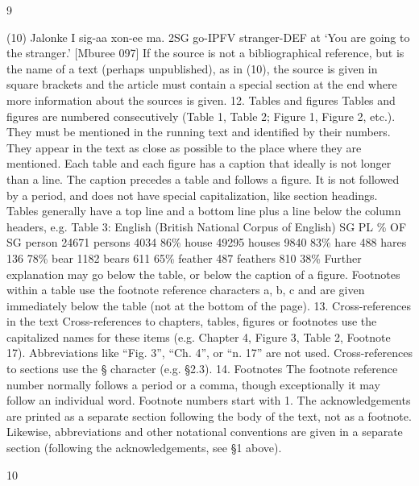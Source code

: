 
 9	
  
(10) Jalonke
I
 sig-aa
 xon-ee
 ma.
2SG go-IPFV stranger-DEF at
‘You are going to the stranger.’ [Mburee 097]
If the source is not a bibliographical reference, but is the name of a text (perhaps
unpublished), as in (10), the source is given in square brackets and the article must contain
a special section at the end where more information about the sources is given.
12. Tables and figures
Tables and figures are numbered consecutively (Table 1, Table 2; Figure 1, Figure 2, etc.).
They must be mentioned in the running text and identified by their numbers. They appear
in the text as close as possible to the place where they are mentioned.
Each table and each figure has a caption that ideally is not longer than a line. The
caption precedes a table and follows a figure. It is not followed by a period, and does not
have special capitalization, like section headings.
Tables generally have a top line and a bottom line plus a line below the column headers,
e.g.
Table 3: English (British National Corpus of English)
SG
 PL
 \% OF SG
person
 24671 persons 4034
 86\%
house
 49295 houses 9840
 83\%
hare
 488
 hares
 136
 78\%
bear
 1182
 bears
 611
 65\%
feather
 487
 feathers 810
 38\%
Further explanation may go below the table, or below the caption of a figure.
Footnotes within a table use the footnote reference characters a, b, c and are given
immediately below the table (not at the bottom of the page).
13. Cross-references in the text
Cross-references to chapters, tables, figures or footnotes use the capitalized names for these
items (e.g. Chapter 4, Figure 3, Table 2, Footnote 17). Abbreviations like “Fig. 3”, “Ch. 4”,
or “n. 17” are not used.
Cross-references to sections use the § character (e.g. §2.3).
14. Footnotes
The footnote reference number normally follows a period or a comma, though
exceptionally it may follow an individual word.
Footnote numbers start with 1. The acknowledgements are printed as a separate section
following the body of the text, not as a footnote. Likewise, abbreviations and other
notational conventions are given in a separate section (following the acknowledgements, see
§1 above).
	
 
 10	
  
